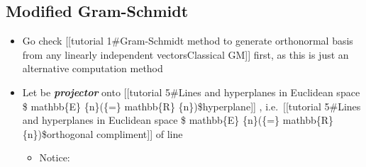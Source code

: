 \subsection*{Modified Gram-Schmidt}

\begin{itemize}

  \item
        Go check {[}{[}tutorial 1\#Gram-Schmidt method to generate orthonormal
        basis from any linearly independent vectors\textbar Classical GM{]}{]}
        first, as this is just an alternative computation method
  \item
        Let
        be \textbf{\emph{projector}} onto {[}{[}tutorial 5\#Lines and
        hyperplanes in Euclidean space \$ mathbb\{E\} \{n\}(\{=\} mathbb\{R\}
        \{n\})\$\textbar hyperplane{]}{]}
        , i.e.~{[}{[}tutorial
        5\#Lines and hyperplanes in Euclidean space \$ mathbb\{E\} \{n\}(\{=\}
        mathbb\{R\} \{n\})\$\textbar orthogonal compliment{]}{]} of line

        \begin{itemize}

          \item
                Notice:

                \begin{itemize}


\end{itemize}
\end{itemize}
\end{itemize}
